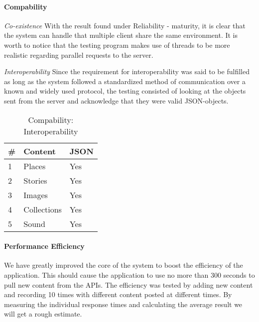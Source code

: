 \paragraph{Compability}

\emph{Co-existence}
With the result found under Reliability - maturity, it is clear that the system can handle that multiple client share the same environment. It is worth to notice that the testing program makes use of threads to be more realistic regarding parallel requests to the server.

\emph{Interoperability}
Since the requirement for interoperability was said to be fulfilled as long as the system followed a standardized method of communication over a known and widely used protocol, the testing consisted of looking at the objects sent from the server and acknowledge that they were valid JSON-objects.

\begin{table}[!htp]
\begin{center}
	\begin{tabular}{ | l | l | l | }
	\hline
	 \#	 	& Content 		& JSON 	\\ \hline
	 1		&Places		& Yes	\\ \hline
	 2		&Stories		& Yes	\\ \hline
	 3		&Images		& Yes	\\ \hline
	 4		&Collections	& Yes	\\ \hline
	 5		&Sound		& Yes 	\\
	 \hline
 	 \end{tabular}
\end{center}
\caption{Compability: Interoperability}
\label{tab:Compability: Interoperability}
\end{table}

\paragraph{Performance Efficiency}
We have greatly improved the core of the system to boost the efficiency of the application. This should cause the application to use no more than 300 seconds to pull new content from the APIs. The efficiency was tested by adding new content and recording 10 times with different content posted at different times. By measuring the individual response times and calculating the average result we will get a rough estimate.\\

